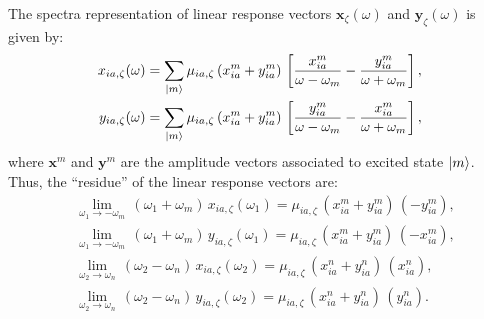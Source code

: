 \documentclass[11pt,a4paper]{article}
\begin{document}
The spectra representation of linear response vectors $\mathbf x_\zeta(\omega)$ and $\mathbf y_\zeta(\omega)$ is given by: \cite{dewergifosseNonlinearresponsePropertiesSimplified2019}\begin{align*}
	x_{ia,\zeta}(\omega) &= \sum_{\ket{m}} \mu_{ia,\zeta}\,(x^{m}_{ia} + y^{m}_{ia})\,\left[\frac{x_{ia}^{m}}{\omega-\omega_m}-\frac{y_{ia}^{m}}{\omega+\omega_m}\right],\\
	y_{ia,\zeta}(\omega) &= \sum_{\ket{m}} \mu_{ia,\zeta}\,(x^{m}_{ia} + y^{m}_{ia})\,\left[\frac{y_{ia}^{m}}{\omega-\omega_m}-\frac{x_{ia}^{m}}{\omega+\omega_m}\right],
\end{align*}
where $\mathbf x^m$ and $\mathbf y^m$ are the amplitude vectors associated to excited state $\ket{m}$.  
Thus, the ``residue'' of the linear response vectors are:\begin{align*}
	&\lim_{\omega_1\to-\omega_m}\,(\omega_1+\omega_m)\,	x_{ia,\zeta}(\omega_1) =  \mu_{ia,\zeta}\,(x^{m}_{ia} + y^{m}_{ia})\,(-y_{ia}^m), \\
	&\lim_{\omega_1\to-\omega_m}\,(\omega_1+\omega_m)\,	y_{ia,\zeta}(\omega_1) =  \mu_{ia,\zeta}\,(x^{m}_{ia} + y^{m}_{ia})\,(-x_{ia}^m), \\
	&\lim_{\omega_2\to\omega_n}\,(\omega_2-\omega_n)\,	x_{ia,\zeta}(\omega_2) =  \mu_{ia,\zeta}\,(x^{n}_{ia} + y^{n}_{ia})\,(x_{ia}^n), \\
	&\lim_{\omega_2\to\omega_n}\,(\omega_2-\omega_n)\,y_{ia,\zeta}(\omega_2) =  \mu_{ia,\zeta}\,(x^{n}_{ia} + y^{n}_{ia})\,(y_{ia}^n).
\end{align*}
\end{document}
